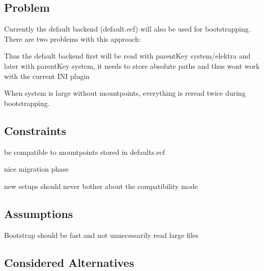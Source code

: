 \subsection*{Problem}

Currently the default backend (default.\+ecf) will also be used for bootstrapping. There are two problems with this approach\+:


\begin{DoxyEnumerate}
\item Thus the default backend first will be read with parent\+Key {\ttfamily system/elektra} and later with parent\+Key {\ttfamily system}, it needs to store absolute paths and thus won\textquotesingle{}t work with the current I\+NI plugin
\item When {\ttfamily system} is large without mountpoints, everything is reread twice during bootstrapping.
\end{DoxyEnumerate}

\subsection*{Constraints}


\begin{DoxyItemize}
\item be compatible to mountpoints stored in {\ttfamily defaults.\+ecf}
\item nice migration phase
\item new setups should never bother about the compatibility mode
\end{DoxyItemize}

\subsection*{Assumptions}


\begin{DoxyItemize}
\item Bootstrap should be fast and not unnecessarily read large files
\end{DoxyItemize}

\subsection*{Considered Alternatives}


